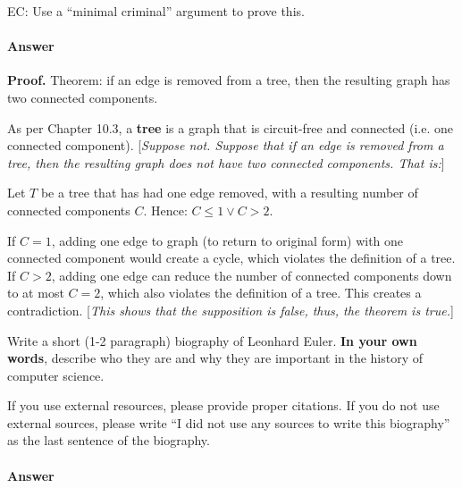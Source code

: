 \documentclass{article}
\begin{document}
EC:
Use a ``minimal criminal'' argument to prove this.

        \paragraph{Answer}
\textbf{Proof.}
Theorem: if an edge is removed from a tree, then the resulting graph has two connected components.

As per Chapter 10.3, a \textbf{tree} is a graph that is circuit-free and connected (i.e. one connected component).
[\emph{Suppose not. Suppose that if an edge is removed from a tree, then the resulting graph does not have two connected components. That is:}]

Let $T$ be a tree that has had one edge removed, with a resulting number of connected components $C$. Hence: $C \leq 1 \lor C > 2$.

If $C = 1$, adding one edge to graph (to return to original form) with one connected component would create a cycle, which violates the definition of a tree. If $C > 2$, adding one edge can reduce the number of connected components down to at most $C = 2$, which also violates the definition of a tree. This creates a contradiction. [\emph{This shows that the supposition is false, thus, the theorem is true.}]

\collab{}

Write a short (1-2 paragraph) biography of Leonhard Euler.
\textbf{In your own words}, describe who they are and why they are important in
the history of computer science.

If you use external resources, please provide
proper citations. If you do not use external sources, please write ``I did not
use any sources to write this biography'' as the last sentence of the
biography.

\paragraph{Answer}
\end{document}
